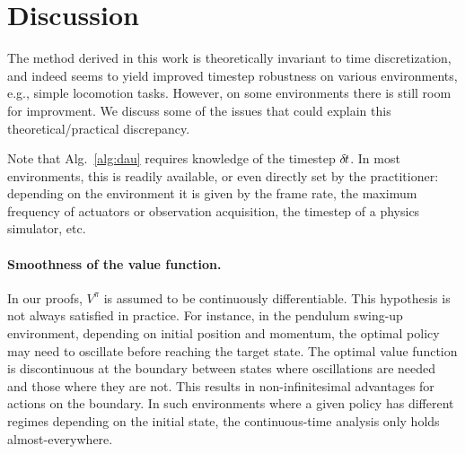 \section{Discussion}
\label{sec:discussions}

The method derived in this work is theoretically invariant to time
discretization, and
indeed seems to yield improved timestep robustness
on various environments, e.g.,
simple locomotion tasks.  However, on some environments there is still
room for improvment. We discuss some of the issues
that could explain this theoretical/practical discrepancy.

Note that Alg.~\ref{alg:dau} requires
knowledge of the timestep ${\delta\hspace{-.1em}t}$. In most environments, this is
readily available, or even directly set by the practitioner: depending on
the environment it is given by the frame rate, the maximum frequency of
actuators or observation acquisition, the timestep of a physics
simulator, etc. 

\paragraph{Smoothness of the value function.} In our proofs, $V^\pi$ is
assumed to be continuously differentiable.  This %
hypothesis is not always satisfied in practice. 
For instance, in the pendulum swing-up environment, depending on initial
position and momentum, the optimal policy may need to oscillate before
reaching the target state. The optimal value
function is discontinuous at the boundary between states where
oscillations are needed and those where they are not.
This results in non-infinitesimal advantages
for actions on the boundary. In such environments where a given policy
has different regimes depending on the initial state, the continuous-time
analysis only holds almost-everywhere.

